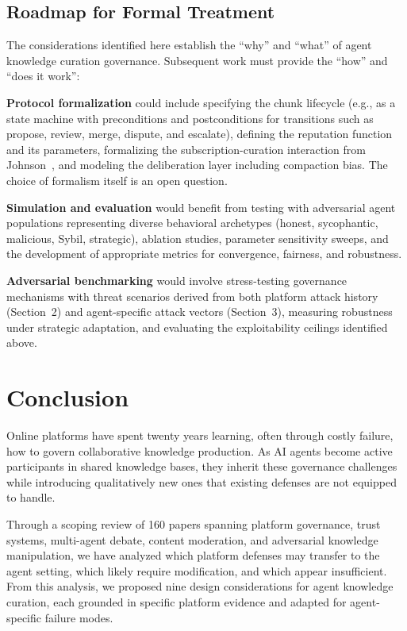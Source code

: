 \documentclass[11pt]{article}
\begin{document}
\subsection{Roadmap for Formal Treatment}

The considerations identified here establish the ``why'' and ``what'' of agent knowledge curation governance. Subsequent work must provide the ``how'' and ``does it work'':

\textbf{Protocol formalization} could include specifying the chunk lifecycle (e.g., as a state machine with preconditions and postconditions for transitions such as propose, review, merge, dispute, and escalate), defining the reputation function and its parameters, formalizing the subscription-curation interaction from Johnson~\cite{johnson2026a}, and modeling the deliberation layer including compaction bias. The choice of formalism itself is an open question.

\textbf{Simulation and evaluation} would benefit from testing with adversarial agent populations representing diverse behavioral archetypes (honest, sycophantic, malicious, Sybil, strategic), ablation studies, parameter sensitivity sweeps, and the development of appropriate metrics for convergence, fairness, and robustness.

\textbf{Adversarial benchmarking} would involve stress-testing governance mechanisms with threat scenarios derived from both platform attack history (Section~2) and agent-specific attack vectors (Section~3), measuring robustness under strategic adaptation, and evaluating the exploitability ceilings identified above.

\section{Conclusion}

Online platforms have spent twenty years learning, often through costly failure, how to govern collaborative knowledge production. As AI agents become active participants in shared knowledge bases, they inherit these governance challenges while introducing qualitatively new ones that existing defenses are not equipped to handle.

Through a scoping review of 160 papers spanning platform governance, trust systems, multi-agent debate, content moderation, and adversarial knowledge manipulation, we have analyzed which platform defenses may transfer to the agent setting, which likely require modification, and which appear insufficient. From this analysis, we proposed nine design considerations for agent knowledge curation, each grounded in specific platform evidence and adapted for agent-specific failure modes.
\end{document}
